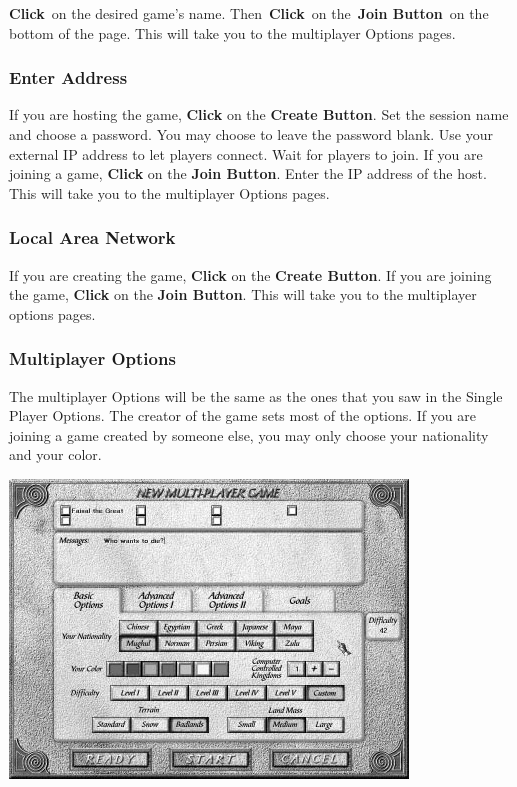 \textbf{Click} on the desired game’s name. Then \textbf{Click} on the \textbf{Join Button} on the bottom of the page. This will take you to the multiplayer Options pages.

\subsubsection{Enter Address}

If you are hosting the game, \textbf{Click} on the \textbf{Create Button}. Set the session name and choose a password. You may choose to leave the password blank. Use your external IP address to let players connect. Wait for players to join. If you are joining a game, \textbf{Click} on the \textbf{Join Button}. Enter the IP address of the host. This will take you to the multiplayer Options pages.

\subsubsection{Local Area Network}

If you are creating the game, \textbf{Click} on the \textbf{Create Button}. If you are joining the game, \textbf{Click} on the \textbf{Join Button}. This will take you to the multiplayer options pages.

\subsubsection{Multiplayer Options}

The multiplayer Options will be the same as the ones that you saw in the Single Player Options. The creator of the game sets most of the options. If you are joining a game created by someone else, you may only choose your nationality and your color.

\begin{center}
	\includegraphics[width=0.7\linewidth]{Imultiplayer3}
\end{center}

